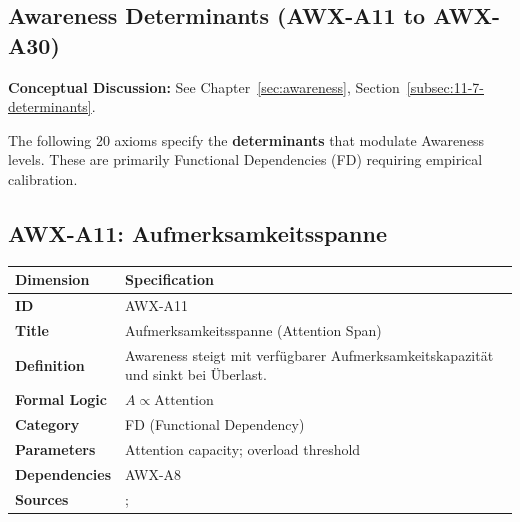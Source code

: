
\subsection{Awareness Determinants (AWX-A11 to AWX-A30)}

\begin{cross-reference}
\textbf{Conceptual Discussion:} See Chapter~\ref{sec:awareness}, Section~\ref{subsec:11-7-determinants}.
\end{cross-reference}
The following 20 axioms specify the \textbf{determinants} that modulate Awareness levels. These are primarily Functional Dependencies (FD) requiring empirical calibration.


\subsection{AWX-A11: Aufmerksamkeitsspanne}

\begin{table}[htbp]
\small
\begin{tabular}{p{3cm}p{11cm}}
\toprule
\textbf{Dimension} & \textbf{Specification} \\
\midrule
\textbf{ID} & AWX-A11 \\
\textbf{Title} & Aufmerksamkeitsspanne (Attention Span) \\
\textbf{Definition} & Awareness steigt mit verfügbarer Aufmerksamkeitskapazität und sinkt bei Überlast. \\
\textbf{Formal Logic} & $A \propto \text{Attention}$ \\
\textbf{Category} & FD (Functional Dependency) \\
\textbf{Parameters} & Attention capacity; overload threshold \\
\textbf{Dependencies} & AWX-A8 \\
\textbf{Sources} & \citet{kahneman2003maps}; \citet{sims2003implications} \\
\bottomrule
\end{tabular}
\end{table}

